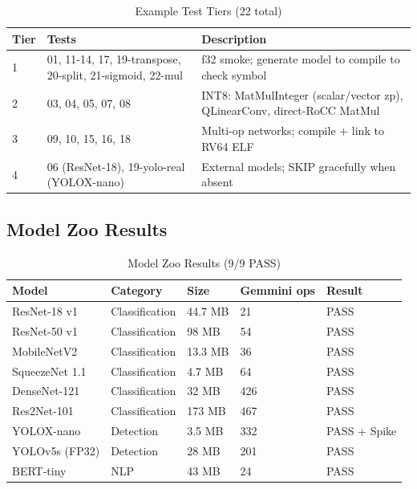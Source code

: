 \documentclass[12pt,a4paper]{article}
\begin{document}
\begin{table}[H]
\centering
\begin{tabular}{|p{}|p{}|p{}|}
\hline
\textbf{Tier} & \textbf{Tests} & \textbf{Description} \\
\hline
1 & 01, 11-14, 17, 19-transpose, 20-split, 21-sigmoid, 22-mul & f32 smoke; generate model to compile to check symbol \\
\hline
2 & 03, 04, 05, 07, 08 & INT8: MatMulInteger (scalar/vector zp), QLinearConv, direct-RoCC MatMul \\
\hline
3 & 09, 10, 15, 16, 18 & Multi-op networks; compile + link to RV64 ELF \\
\hline
4 & 06 (ResNet-18), 19-yolo-real (YOLOX-nano) & External models; SKIP gracefully when absent \\
\hline
\end{tabular}
\caption{Example Test Tiers (22 total)}
\end{table}

\subsection{Model Zoo Results}

\begin{table}[H]
\centering
\begin{tabular}{|p{}|p{}|p{}|p{}|p{}|}
\hline
\textbf{Model} & \textbf{Category} & \textbf{Size} & \textbf{Gemmini ops} & \textbf{Result} \\
\hline
ResNet-18 v1 & Classification & 44.7 MB & 21 & PASS \\
\hline
ResNet-50 v1 & Classification & 98 MB & 54 & PASS \\
\hline
MobileNetV2 & Classification & 13.3 MB & 36 & PASS \\
\hline
SqueezeNet 1.1 & Classification & 4.7 MB & 64 & PASS \\
\hline
DenseNet-121 & Classification & 32 MB & 426 & PASS \\
\hline
Res2Net-101 & Classification & 173 MB & 467 & PASS \\
\hline
YOLOX-nano & Detection & 3.5 MB & 332 & PASS + Spike \\
\hline
YOLOv5s (FP32) & Detection & 28 MB & 201 & PASS \\
\hline
BERT-tiny & NLP & 43 MB & 24 & PASS \\
\hline
\end{tabular}
\caption{Model Zoo Results (9/9 PASS)}
\end{table}
\end{document}
